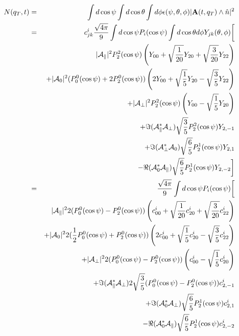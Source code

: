 \documentclass[a4paper,9pt,twoside]{article}
\begin{document}
\begin{eqnarray}
    N(q_T,t)  &=&  \int d\cos\psi\int d\cos\theta \int d\phi \epsilon(\psi,\theta,\phi) |{\bf A}(t,q_T) \wedge \hat{n}|^2 \\
      &=& c^i_{jk}\frac{\sqrt{4\pi}}{9} \int d\cos\psi   P_i(\cos\psi)  \int d\cos\theta d\phi Y_{jk}(\theta,\phi) 
          \biggl[  \\
          &&                   |{\cal A}_\parallel|^2 P_2^2(\cos\psi) \left( Y_{00}+\sqrt{\frac{1}{20}}Y_{20}+\sqrt{\frac{3}{20}}Y_{22}  \right)  \\
          &&                  +|{\cal A}_0|^2  (P_0^0(\cos\psi)+2P_2^0(\cos\psi) ) \left( 2Y_{00}+\sqrt{\frac{1}{5}}Y_{20}-\sqrt{\frac{3}{5}}Y_{22} \right) \\
          &&                  +|{\cal A}_\perp|^2  P_2^2(\cos\psi) \left( Y_{00} - \sqrt{\frac{1}{5}}Y_{20}\right)\\
          &&                  +\Im({\cal A}_\parallel^*{\cal A}_\perp)\sqrt{\frac{3}{5}}P_2^2(\cos\psi) Y_{2,-1}  \\
          &&                  +\Im({\cal A}_\perp^* {\cal A}_0 )      \sqrt{\frac{6}{5}}P_2^1(\cos\psi)Y_{2,1} \\
          &&                  -\Re({\cal A}_0^*{\cal A}_\parallel  )  \sqrt{\frac{6}{5}}P_2^1(\cos\psi) Y_{2,-2} 
          \biggr] \\
      &=& \frac{\sqrt{4\pi}}{9}  \int d\cos\psi   P_i(\cos\psi) \biggl[  \\
          &&                   |{\cal A}_\parallel|^2 2( P_0^0(\cos\psi) - P_2^0(\cos\psi)  )           \left( c^i_{00}  +\sqrt{\frac{1}{20}}c^i_{20}+\sqrt{\frac{3}{20}}c^i_{22}  \right)  \\
          &&                  +|{\cal A}_0|^2 2 (\frac{1}{2}P_0^0(\cos\psi)+P_2^0(\cos\psi) ) \left( 2 c^i_{00}+\sqrt{\frac{1}{ 5}}c^i_{20}-\sqrt{\frac{3}{ 5}}c^i_{22} \right) \\
          &&                  +|{\cal A}_\perp|^2 2 ( P_0^0(\cos\psi) - P_2^0(\cos\psi)  )              \left( c^i_{00}  -\sqrt{\frac{1}{ 5}}c^i_{20}\right)\\
          &&                  +\Im({\cal A}_\parallel^*{\cal A}_\perp)2\sqrt{\frac{3}{5}} ( P_0^0(\cos\psi) - P_2^0(\cos\psi)  ) c^i_{2,-1}  \\
          &&                  +\Im({\cal A}_0^* {\cal A}_\perp )      \sqrt{\frac{6}{5}}P_2^1(\cos\psi)c^i_{2,1} \\
          &&                  -\Re({\cal A}_0^*{\cal A}_\parallel  )  \sqrt{\frac{6}{5}}P_2^1(\cos\psi) c^i_{2,-2} 

\end{eqnarray}
\end{document}
